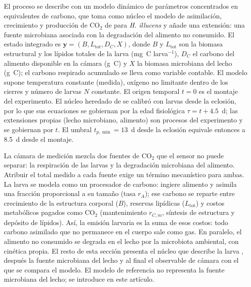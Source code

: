 
El proceso se describe con un modelo dinámico de parámetros concentrados en equivalentes de carbono, que toma como núcleo el modelo de asimilación, crecimiento y producción de CO$_2$ de \textcite{eriksenDynamicModellingFeed2022} para \textit{H. illucens} y añade una extensión: una fuente microbiana asociada con la degradación del alimento no consumido. El estado integrado es $\mathbf{y} = (B, L_{\mathrm{tot}}, D_C, X)$, donde $B$ y $L_{\mathrm{tot}}$ son la biomasa estructural y los lípidos totales de la larva (mg~C larva$^{-1}$), $D_C$ el carbono del alimento disponible en la cámara (g~C) y $X$ la biomasa microbiana del lecho (g~C); el carbono respirado acumulado se lleva como variable contable. El modelo supone temperatura constante (medida), oxígeno no limitante dentro de los cierres y número de larvas $N$ constante. El origen temporal $t = 0$ es el montaje del experimento. El núcleo heredado de \textcite{eriksenDynamicModellingFeed2022} se calibró con larvas desde la eclosión, por lo que sus ecuaciones se gobiernan por la edad fisiológica $\tau = t + 4.5$~d; las extensiones propias (lecho microbiano, alimento) son procesos del experimento y se gobiernan por $t$. El umbral $t_{p,\min} = 13$~d desde la eclosión equivale entonces a 8.5~d desde el montaje.

La cámara de medición mezcla dos fuentes de CO$_2$ que el sensor no puede separar: la respiración de las larvas y la degradación microbiana del alimento. Atribuir el total medido a cada fuente exige un término mecanístico para ambas. La larva se modela como un procesador de carbono: ingiere alimento y asimila una fracción proporcional a su tamaño (tasa $r_A$); ese carbono se reparte entre crecimiento de la estructura corporal ($B$), reservas lipídicas ($L_{\mathrm{tot}}$) y costos metabólicos pagados como CO$_2$ (mantenimiento $r_{C,m}$, síntesis de estructura y depósito de lípidos). Así, la emisión larvaria es la suma de esos costos: todo carbono asimilado que no permanece en el cuerpo sale como gas. En paralelo, el alimento no consumido se degrada en el lecho por la microbiota ambiental, con cinética propia. El resto de esta sección presenta el núcleo que describe la larva \parencite{eriksenDynamicModellingFeed2022}, después la fuente microbiana del lecho y al final el observable de cámara con el que se compara el modelo. El modelo de referencia no representa la fuente microbiana del lecho; se introduce en este artículo.

